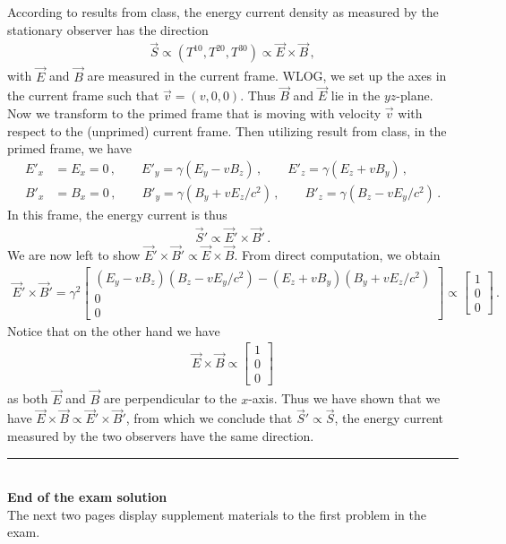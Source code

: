 \documentclass[11pt, onesided]{book}
\theoremstyle{break}
\theoremstyle{break}
\newcommand{\bmat}[1]{\begin{bmatrix} #1 \end{bmatrix}}
\begin{document}
According to results from class, the energy current density as measured by the stationary observer has the direction
\begin{align*}
\vec{S} \propto (T^{10}, T^{20}, T^{30}) \propto \vec{E}\times \vec{B}\,,
\end{align*}
with $\vec{E}$ and $\vec{B}$ are measured in the current frame. WLOG, we set up the axes in the current frame such that $\vec{v} = (v,0,0)$. Thus $\vec{B}$ and $\vec{E}$ lie in the $yz$-plane. Now we transform to the primed frame that is moving with velocity $\vec{v}$ with respect to the (unprimed) current frame. Then utilizing result from class, in the primed frame, we have
\begin{align*}
E'_x&= E_x=0 \,,\qquad
E'_y=\gamma(E_y - v B_z)\,,\qquad
E'_z=\gamma(E_z + v B_y)\,,\qquad\\
B'_x&=B_x=0\,,\qquad
B'_y=\gamma(B_y+vE_z/c^2)\,,\qquad
B'_z=\gamma(B_z-vE_y/c^2)\,.
\end{align*}
In this frame, the energy current is thus
\begin{align*}
\vec{S}' \propto \vec{E}'\times \vec{B}'\,.
\end{align*}
We are now left to show $\vec{E}' \times \vec{B}'\propto \vec{E}\times \vec{B}$. From direct computation, we obtain
\begin{align*}
\vec{E}' \times \vec{B}' = 
\gamma^2\bmat{(E_y - vB_z)(B_z - vE_y/c^2)- (E_z + vB_y)(B_y+vE_z/c^2)\\
0\\
0}\propto \bmat{1 \\ 0 \\ 0}\,.
\end{align*}
Notice that on the other hand we have
\begin{align*}
\vec{E}\times \vec{B} \propto  \bmat{1 \\ 0 \\ 0}
\end{align*}
as both $\vec{E}$ and $\vec{B}$ are perpendicular to the $x$-axis. Thus we have shown that we have $\vec{E}\times \vec{B}\propto \vec{E}' \times \vec{B}'$, from which we conclude that $\vec{S}' \propto \vec{S}$, the energy current measured by the two observers have the same direction.\\

\vspace{3cm}
\noindent\rule{8cm}{1pt}\\
\textbf{End of the exam solution}\\
The next two pages display supplement materials to the first problem in the exam.  


\newpage

\end{document}
